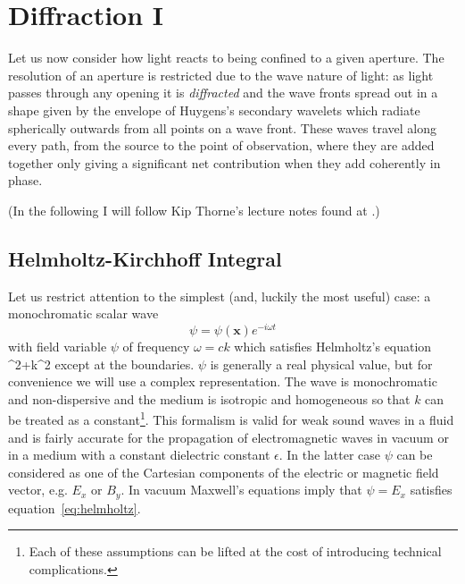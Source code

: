 \chapter{Diffraction I}

Let us now consider how light reacts to being confined to a given aperture. The resolution 
of an aperture is restricted due to the wave nature of light: as light passes through any 
opening it is {\it diffracted} and the wave fronts spread out in a shape given by the 
envelope of Huygens's secondary wavelets which radiate spherically outwards from all points on 
a wave front. These waves travel along every path, from the source to the point of observation,
where they are added together only giving a significant net contribution when they add 
coherently in phase. 

\noindent (In the following I will follow Kip Thorne's lecture notes found at 
.)

\section{Helmholtz-Kirchhoff Integral}

Let us restrict attention to the simplest (and, luckily the most
useful) case: a monochromatic scalar wave 
\[
\psi=\psi({\mathbf x})e^{-i\omega t}
\]
with field variable $\psi$ of frequency $\omega=ck$ which satisfies Helmholtz's equation
\be
\nabla^2\psi+k^2
\label{eq:helmholtz}
\ee
except at the boundaries. $\psi$ is generally a real physical value, but for convenience we will
use a complex representation. The wave is monochromatic and non-dispersive and the medium is
isotropic and homogeneous so that $k$ can be treated as a constant\footnote{Each of these 
assumptions can be lifted at the cost of introducing technical complications.}. This formalism
is valid for weak sound waves in a fluid and is fairly accurate for the propagation of 
electromagnetic waves in vacuum or in a medium with a constant dielectric constant $\epsilon$. 
In the latter case $\psi$ can be considered as one of the Cartesian components of the electric
or magnetic field vector, e.g. $E_x$ or $B_y$. In vacuum Maxwell's equations imply that 
$\psi=E_x$ satisfies equation~\ref{eq:helmholtz}. 

